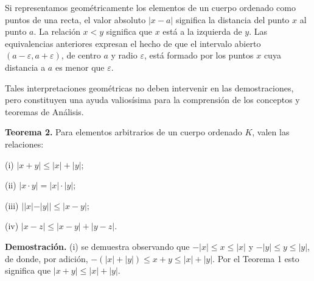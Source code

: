 \documentclass[12pt,oneside]{book}
\begin{document}
Si representamos geométricamente los elementos de un cuerpo ordenado como puntos de una recta, el valor absoluto \(|x-a|\) significa la distancia del punto \(x\) al punto \(a\). La relación \(x < y\) significa que \(x\) está a la izquierda de \(y\). Las equivalencias anteriores expresan el hecho de que el intervalo abierto \((a - \varepsilon, a + \varepsilon)\), de centro \(a\) y radio \(\varepsilon\), está formado por los puntos \(x\) cuya distancia a \(a\) es menor que \(\varepsilon\).

\begin{center}
\end{center}

Tales interpretaciones geométricas no deben intervenir en las demostraciones, pero constituyen una ayuda valiosísima para la comprensión de los conceptos y teoremas de Análisis.

\textbf{Teorema 2.} Para elementos arbitrarios de un cuerpo ordenado \(K\), valen las relaciones:

(i) \(|x + y| \leq |x| + |y|\);

(ii) \(|x \cdot y| = |x| \cdot |y|\);

(iii) \(||x| - |y|| \leq |x - y|\);

(iv) \(|x - z| \leq |x - y| + |y - z|\).

\textbf{Demostración.} (i) se demuestra observando que \(-|x| \leq x \leq |x|\) y \(-|y| \leq y \leq |y|\), de donde, por adición, \(-(|x| + |y|) \leq x + y \leq |x| + |y|\). Por el Teorema 1 esto significa que \(|x + y| \leq |x| + |y|\).
\end{document}
